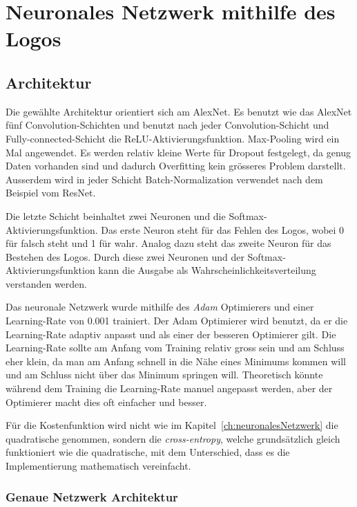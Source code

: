 \documentclass[12pt,a4paper]{report}
\begin{document}
\section{Neuronales Netzwerk mithilfe des Logos}\label{sec:neuronalesNetzwerkMithilfeDesLogos}
\subsection{Architektur}
Die gewählte Architektur orientiert sich am AlexNet\cite{alex}.
Es benutzt wie das AlexNet fünf Convolution-Schichten und benutzt nach jeder Convolution-Schicht und Fully-connected-Schicht die ReLU-Aktivierungsfunktion.
Max-Pooling wird ein Mal angewendet.
Es werden relativ kleine Werte für Dropout festgelegt, da genug Daten vorhanden sind und dadurch Overfitting kein grösseres Problem darstellt.
Ausserdem wird in jeder Schicht Batch-Normalization verwendet nach dem Beispiel vom ResNet\cite{conv}.

Die letzte Schicht beinhaltet zwei Neuronen und die Softmax-Aktivierungsfunktion.
Das erste Neuron steht für das Fehlen des Logos, wobei 0 für falsch steht und 1 für wahr.
Analog dazu steht das zweite Neuron für das Bestehen des Logos.
Durch diese zwei Neuronen und der Softmax-Aktivierungsfunktion kann die Ausgabe als Wahrscheinlichkeitsverteilung verstanden werden.

Das neuronale Netzwerk wurde mithilfe des \textit{Adam} Optimierers\cite{adam} und einer Learning-Rate von 0.001 trainiert.
Der Adam Optimierer wird benutzt, da er die Learning-Rate adaptiv anpasst und als einer der besseren Optimierer gilt\cite{adam}.
Die Learning-Rate sollte am Anfang vom Training relativ gross sein und am Schluss eher klein, da man am Anfang schnell in die Nähe eines Minimums kommen will
und am Schluss nicht über das Minimum springen will.
Theoretisch könnte während dem Training die Learning-Rate manuel angepasst werden, aber der Optimierer macht dies oft einfacher und besser.

Für die Kostenfunktion wird nicht wie im Kapitel~\ref{ch:neuronalesNetzwerk} die quadratische genommen,
sondern die \textit{cross-entropy}\cite{softmax}, welche grundsätzlich gleich funktioniert wie die quadratische, mit dem Unterschied,
dass es die Implementierung mathematisch vereinfacht\cite{softmax}.

\subsubsection{Genaue Netzwerk Architektur}
\end{document}
